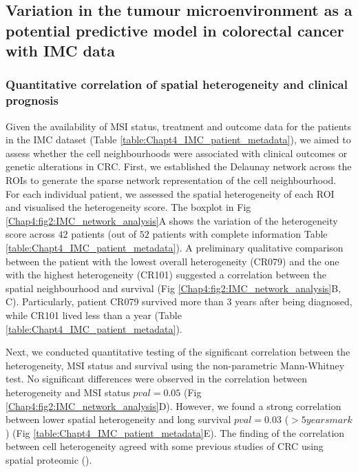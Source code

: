 \subsection{Variation in the tumour microenvironment as a potential predictive model in colorectal cancer with IMC data}
\subsubsection{Quantitative correlation of spatial heterogeneity and clinical prognosis}
Given the availability of MSI status, treatment and outcome data for the patients in the IMC dataset (Table \ref{table:Chapt4_IMC_patient_metadata}), we aimed to assess whether the cell neighbourhoods were associated with clinical outcomes or genetic alterations in CRC. First, we established the Delaunay network across the ROIs to generate the sparse network representation of the cell neighbourhood. For each individual patient, we assessed the spatial heterogeneity of each ROI and visualised the heterogeneity score. The boxplot in Fig \ref{Chap4:fig2:IMC_network_analysis}A shows the variation of the heterogeneity score across $42$ patients (out of $52$ patients with complete information Table \ref{table:Chapt4_IMC_patient_metadata}). A preliminary qualitative comparison between the patient with the lowest overall heterogeneity (CR079) and the one with the highest heterogeneity (CR101) suggested a correlation between the spatial neighbourhood and survival (Fig \ref{Chap4:fig2:IMC_network_analysis}B, C). Particularly, patient CR079 survived more than 3 years after being diagnosed, while CR101 lived less than a year (Table \ref{table:Chapt4_IMC_patient_metadata}). 

Next, we conducted quantitative testing of the significant correlation between the heterogeneity, MSI status and survival using the non-parametric Mann-Whitney test. No significant differences were observed in the correlation between heterogeneity and MSI status $pval=0.05$ (Fig \ref{Chap4:fig2:IMC_network_analysis}D). However, we found a strong correlation between lower spatial heterogeneity and long survival $pval=0.03$ ($>5 years mark$) (Fig \ref{table:Chapt4_IMC_patient_metadata}E). The finding of the correlation between cell heterogeneity agreed with some previous studies of CRC using spatial proteomic (\cite{schurch2020coordinated, li2017reference}). 

